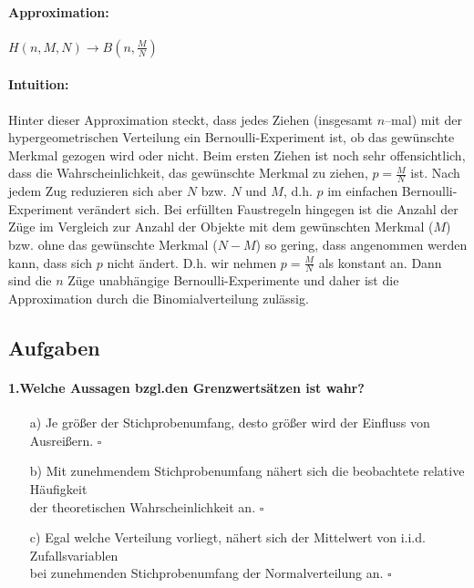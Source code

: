 \documentclass[a4paper]{article}
\begin{document}
\paragraph{Approximation:} $H(n,M,N) \rightarrow B(n, \frac{M}{N})$
\paragraph{Intuition:} Hinter dieser Approximation steckt, dass jedes Ziehen (insgesamt $n$--mal) mit der hypergeometrischen Verteilung ein Bernoulli-Experiment ist, ob das gewünschte Merkmal gezogen wird oder nicht. Beim ersten Ziehen ist noch sehr offensichtlich, dass die Wahrscheinlichkeit, das gewünschte Merkmal zu ziehen, $p=\frac{M}{N}$ ist. Nach jedem Zug reduzieren sich aber $N$ bzw. $N$ und $M$, d.h. $p$ im einfachen Bernoulli-Experiment verändert sich. Bei erfüllten Faustregeln hingegen ist die Anzahl der Züge im Vergleich zur Anzahl der Objekte mit dem gewünschten Merkmal ($M$) bzw. ohne das gewünschte Merkmal ($N-M$) so gering, dass angenommen werden kann, dass sich $p$ nicht ändert. D.h. wir nehmen $p=\frac{M}{N}$ als konstant an. Dann sind die $n$ Züge unabhängige Bernoulli-Experimente und daher ist die Approximation durch die Binomialverteilung zulässig.

\clearpage

\subsection{Aufgaben}
\paragraph{1.Welche Aussagen bzgl.den Grenzwertsätzen ist wahr?}
\begin{itemize}
    \item[a)] Je größer der Stichprobenumfang, desto größer wird der Einfluss von Ausreißern. \hfill $\square$
    \item[b)] Mit zunehmendem Stichprobenumfang nähert sich die beobachtete relative Häufigkeit\\ der theoretischen Wahrscheinlichkeit an. \hfill $\square$
    \item[c)] Egal welche Verteilung vorliegt, nähert sich der Mittelwert von i.i.d. Zufallsvariablen\\ bei zunehmenden Stichprobenumfang der Normalverteilung an. \hfill $\square$
\end{itemize}
\end{document}

